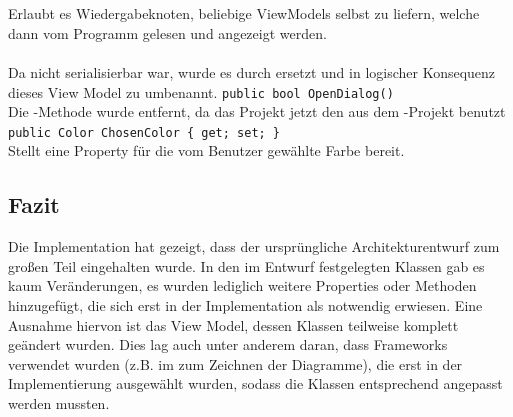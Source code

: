 \paragraph{}~\\
Erlaubt es Wiedergabeknoten, beliebige ViewModels selbst zu liefern, welche dann vom Programm gelesen und angezeigt werden.

\paragraph{}
\begin{itemize}
	\change Da  nicht serialisierbar war, wurde es durch  ersetzt und in logischer Konsequenz dieses View Model zu  umbenannt.
	\remove \verb!public bool OpenDialog()! \\
	Die -Methode wurde entfernt, da das Projekt jetzt den  aus dem -Projekt benutzt
	\add \verb!public Color ChosenColor { get; set; }! \\
	Stellt eine Property für die vom Benutzer gewählte Farbe bereit.
\end{itemize}
\newpage

\subsection*{Fazit}

Die Implementation hat gezeigt, dass der ursprüngliche Architekturentwurf zum großen Teil eingehalten wurde. In den im Entwurf festgelegten Klassen gab es kaum Veränderungen, es wurden lediglich weitere Properties oder Methoden hinzugefügt, die sich erst in der Implementation als notwendig erwiesen. Eine Ausnahme hiervon ist das View Model, dessen Klassen teilweise 
komplett geändert wurden. Dies lag auch unter anderem daran, dass Frameworks verwendet wurden (z.B. im  zum Zeichnen der Diagramme), die erst in der Implementierung ausgewählt wurden, sodass die Klassen entsprechend angepasst werden mussten.
